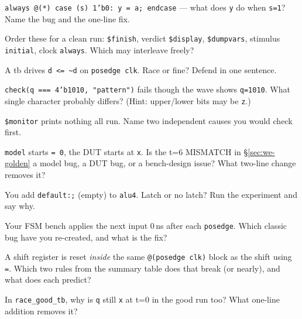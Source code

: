 \begin{exercise}[easy]
\texttt{always @(*) case (s) 1'b0: y = a; endcase} --- what does
\texttt{y} do when \texttt{s=1}? Name the bug and the one-line fix.
\end{exercise}
\begin{exercise}[easy]
Order these for a clean run: \texttt{\$finish}, verdict
\texttt{\$display}, \texttt{\$dumpvars}, stimulus \texttt{initial},
clock \texttt{always}. Which may interleave freely?
\end{exercise}
\begin{exercise}[medium]
A tb drives \texttt{d <= \textasciitilde d} on \texttt{posedge clk}.
Race or fine? Defend in one sentence.
\end{exercise}
\begin{exercise}[medium]
\texttt{check(q === 4'b1010, "pattern")} fails though the wave shows
\texttt{q=1010}. What single character probably differs? (Hint:
upper/lower bits may be \texttt{z}.)
\end{exercise}
\begin{exercise}[medium]
\texttt{\$monitor} prints nothing all run. Name two independent
causes you would check first.
\end{exercise}
\begin{exercise}[medium]
\texttt{model} starts \texttt{= 0}, the DUT starts at \texttt{x}. Is
the t=6 MISMATCH in \S\ref{sec:we-golden} a model bug, a DUT bug, or
a bench-design issue? What two-line change removes it?
\end{exercise}
\begin{exercise}[medium]
You add \texttt{default:;} (empty) to \texttt{alu4}. Latch or no
latch? Run the experiment and say why.
\end{exercise}
\begin{exercise}[medium]
Your FSM bench applies the next input 0\,ns after each
\texttt{posedge}. Which classic bug have you re-created, and what is
the fix?
\end{exercise}
\begin{exercise}[medium]
A shift register is reset \emph{inside} the same
\texttt{@(posedge clk)} block as the shift using \texttt{=}. Which
two rules from the summary table does that break (or nearly), and
what does each predict?
\end{exercise}
\begin{exercise}[medium]
In \texttt{race\_good\_tb}, why is \texttt{q} still \texttt{x} at
t=0 in the good run too? What one-line addition removes it?
\end{exercise}
